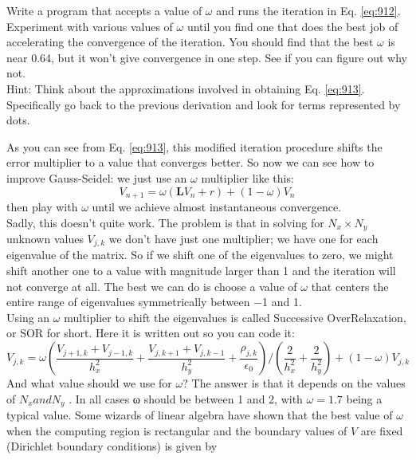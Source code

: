 \begin{problem}\label{P9.4} Write a program that accepts a value of $\omega$ and runs the iteration in Eq. \eqref{eq:912}.
Experiment with various values of $\omega$ until you find one that does the best
job of accelerating the convergence of the iteration. You should find that
the best $\omega$ is near 0.64, but it won’t give convergence in one step. See if you
can figure out why not.\\
Hint: Think about the approximations involved in obtaining Eq. \eqref{eq:913}. Specifically go back to the previous derivation and look for terms represented by dots.\\
\end{problem}
As you can see from Eq. \eqref{eq:913}, this modified iteration procedure shifts the
error multiplier to a value that converges better. So now we can see how to
improve Gauss-Seidel: we just use an $\omega$ multiplier like this:
\begin{equation}\label{eq:914}
V_{n+1}=\omega\left(\mathbf{L} V_{n}+r\right)+(1-\omega) V_{n}
\end{equation}
then play with $\omega$ until we achieve almost instantaneous convergence. \\ 
Sadly, this doesn\rq t quite work. The problem is that in solving for $N_x × N_y$
unknown values $V_{j,k}$ we don\rq t have just one multiplier; we have one for each
eigenvalue of the matrix. So if we shift one of the eigenvalues to zero, we might
shift another one to a value with magnitude larger than 1 and the iteration will
not converge at all. The best we can do is choose a value of $\omega$ that centers the
entire range of eigenvalues symmetrically between −1 and 1. \\ 
Using an $\omega$ multiplier to shift the eigenvalues is called Successive OverRelaxation, or SOR for short. Here it is written out so you can code it:
\begin{equation}\label{eq:915}
V_{j, k}=\omega\left(\frac{V_{j+1, k}+V_{j-1, k}}{h_{x}^{2}}+\frac{V_{j, k+1}+V_{j, k-1}}{h_{y}^{2}}+\frac{\rho_{j, k}}{\epsilon_{0}}\right) /\left(\frac{2}{h_{x}^{2}}+\frac{2}{h_{y}^{2}}\right)+(1-\omega) V_{j, k}
\end{equation}
And what value should we use for $\omega$? The answer is that it depends on the values
of $N_x and N_y$ . In all cases ω should be between 1 and 2, with $\omega = 1.7$ being a
typical value. Some wizards of linear algebra have shown that the best value of $\omega$ when the computing region is rectangular and the boundary values of $V$ are fixed (Dirichlet boundary conditions) is given by
